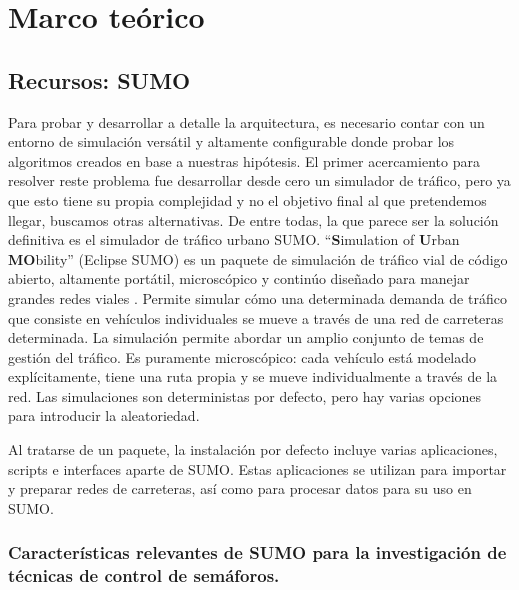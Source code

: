 
\chapter{Marco teórico} %
\graphicspath{{./imagenes/}}
\linespread{1.3}
\hypertarget{recursos-sumo}{%
\section{Recursos: SUMO}\label{recursos-sumo}}

Para probar y desarrollar a detalle la arquitectura, es necesario contar
con un entorno de simulación versátil y altamente configurable donde
probar los algoritmos creados en base a nuestras hipótesis. El primer
acercamiento para resolver reste problema fue desarrollar desde cero un
simulador de tráfico, pero ya que esto tiene su propia complejidad y no
el objetivo final al que pretendemos llegar, buscamos otras
alternativas. De entre todas, la que parece ser la solución definitiva
es el simulador de tráfico urbano SUMO. ``\textbf{S}imulation of
\textbf{U}rban \textbf{MO}bility'' (Eclipse SUMO) es un paquete de
simulación de tráfico vial de código abierto, altamente portátil,
microscópico y continúo diseñado para manejar grandes redes viales
\textcite{SUMO2018}. Permite simular cómo una determinada demanda de
tráfico que consiste en vehículos individuales se mueve a través de una
red de carreteras determinada. La simulación permite abordar un amplio
conjunto de temas de gestión del tráfico. Es puramente microscópico:
cada vehículo está modelado explícitamente, tiene una ruta propia y se
mueve individualmente a través de la red. Las simulaciones son
deterministas por defecto, pero hay varias opciones para introducir la
aleatoriedad.

Al tratarse de un paquete, la instalación por defecto incluye varias
aplicaciones, scripts e interfaces aparte de SUMO. Estas aplicaciones se
utilizan para importar y preparar redes de carreteras, así como para
procesar datos para su uso en SUMO.

\hypertarget{caracteruxedsticas-relevantes-de-sumo-para-la-investigaciuxf3n-de-tuxe9cnicas-de-control-de-semuxe1foros.}{%
\subsection{Características relevantes de SUMO para la investigación de
técnicas de control de
semáforos.}\label{caracteruxedsticas-relevantes-de-sumo-para-la-investigaciuxf3n-de-tuxe9cnicas-de-control-de-semuxe1foros.}}

